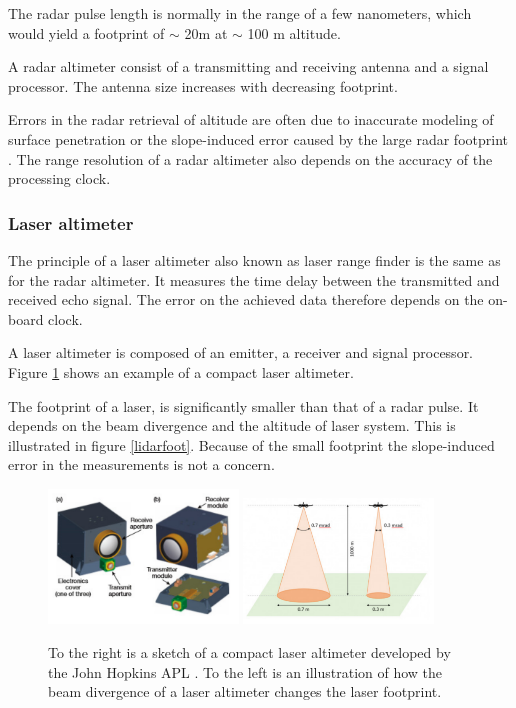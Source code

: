 The radar pulse length is normally in the range of a few nanometers, which would yield a footprint of $\sim$ 20m at $\sim$ 100 m altitude.

A radar altimeter consist of a transmitting and receiving antenna and a signal processor. The antenna size increases with decreasing footprint.

Errors in the radar retrieval of altitude are often due to inaccurate modeling
of surface penetration or the slope-induced error caused by
the large radar footprint \cite{icealti}. The range resolution of a radar altimeter also depends on the accuracy of the processing clock.


\subsubsection{Laser altimeter}

The principle of a laser altimeter also known as laser range finder is the same as for the radar altimeter. It measures the time delay between the transmitted and received echo signal. The error on the achieved data therefore depends on the on-board clock.

A laser altimeter is composed of an emitter, a receiver and signal processor. Figure \ref{alti} shows an example of a compact laser altimeter. 

The footprint of a laser, is significantly smaller than that of a radar pulse. It depends on the beam divergence and the altitude of laser system. This is illustrated in figure \ref{lidarfoot}.  Because of the small footprint the slope-induced error in the measurements is not a concern.

\begin{figure}[htb]
\begin{center}
\includegraphics[width=0.45\textwidth]{figures/navtheory/CLA}
\includegraphics[width=0.45\textwidth]{figures/navtheory/lidarfoot}
\caption{To the right is a sketch of a compact laser altimeter developed by the John Hopkins APL \cite{APLCLA}. To the left is an illustration of how the beam divergence of a laser altimeter changes the laser footprint.\cite{footprint}}
\label{alti}
\end{center}
\end{figure}

